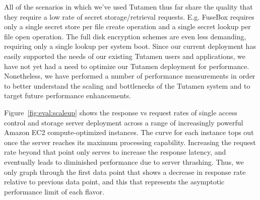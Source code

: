 All of the scenarios in which we've used Tutamen thus far share the
quality that they require a low rate of secret storage/retrieval
requests. E.g. FuseBox requires only a single secret store per file
create operation and a single secret lookup per file open
operation. The full disk encryption schemes are even less demanding,
requiring only a single lookup per system boot. Since our current
deployment has easily supported the needs of our existing Tutamen
users and applications, we have not yet had a need to optimize our
Tutamen deployment for performance. Nonetheless, we have performed a
number of performance measurements in order to better understand the
scaling and bottlenecks of the Tutamen system and to target future
performance enhancements.

Figure~\ref{fig:eval:scaleup} shows the response vs request rates of
single access control and storage server deployment across a range of
increasingly powerful Amazon EC2 compute-optimized instances. The
curve for each instance tops out once the server reaches its maximum
processing capability. Increasing the request rate beyond that point
only serves to increase the response latency, and eventually leads to
diminished performance due to server thrashing. Thus, we only graph
through the first data point that shows a decrease in response rate
relative to previous data point, and this that represents the
asymptotic performance limit of each flavor.

